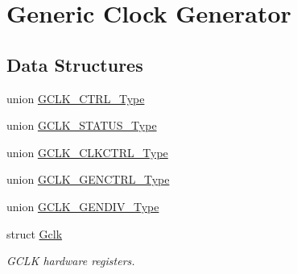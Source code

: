 \hypertarget{group___s_a_m_d21___g_c_l_k}{}\section{Generic Clock Generator}
\label{group___s_a_m_d21___g_c_l_k}
\subsection*{Data Structures}
\begin{DoxyCompactItemize}
\item 
union \mbox{\hyperlink{union_g_c_l_k___c_t_r_l___type}{G\+C\+L\+K\+\_\+\+C\+T\+R\+L\+\_\+\+Type}}
\item 
union \mbox{\hyperlink{union_g_c_l_k___s_t_a_t_u_s___type}{G\+C\+L\+K\+\_\+\+S\+T\+A\+T\+U\+S\+\_\+\+Type}}
\item 
union \mbox{\hyperlink{union_g_c_l_k___c_l_k_c_t_r_l___type}{G\+C\+L\+K\+\_\+\+C\+L\+K\+C\+T\+R\+L\+\_\+\+Type}}
\item 
union \mbox{\hyperlink{union_g_c_l_k___g_e_n_c_t_r_l___type}{G\+C\+L\+K\+\_\+\+G\+E\+N\+C\+T\+R\+L\+\_\+\+Type}}
\item 
union \mbox{\hyperlink{union_g_c_l_k___g_e_n_d_i_v___type}{G\+C\+L\+K\+\_\+\+G\+E\+N\+D\+I\+V\+\_\+\+Type}}
\item 
struct \mbox{\hyperlink{struct_gclk}{Gclk}}
\begin{DoxyCompactList}\small\item\em G\+C\+LK hardware registers. \end{DoxyCompactList}\end{DoxyCompactItemize}
